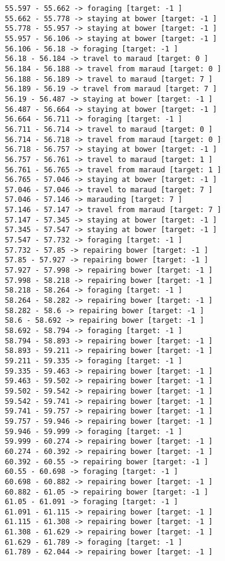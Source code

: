 \documentclass[11pt]{article}
\begin{document}
\begin{Verbatim}[commandchars=\\\{\}]
55.597 - 55.662 -> foraging [target: -1 ]
55.662 - 55.778 -> staying at bower [target: -1 ]
55.778 - 55.957 -> staying at bower [target: -1 ]
55.957 - 56.106 -> staying at bower [target: -1 ]
56.106 - 56.18 -> foraging [target: -1 ]
56.18 - 56.184 -> travel to maraud [target: 0 ]
56.184 - 56.188 -> travel from maraud [target: 0 ]
56.188 - 56.189 -> travel to maraud [target: 7 ]
56.189 - 56.19 -> travel from maraud [target: 7 ]
56.19 - 56.487 -> staying at bower [target: -1 ]
56.487 - 56.664 -> staying at bower [target: -1 ]
56.664 - 56.711 -> foraging [target: -1 ]
56.711 - 56.714 -> travel to maraud [target: 0 ]
56.714 - 56.718 -> travel from maraud [target: 0 ]
56.718 - 56.757 -> staying at bower [target: -1 ]
56.757 - 56.761 -> travel to maraud [target: 1 ]
56.761 - 56.765 -> travel from maraud [target: 1 ]
56.765 - 57.046 -> staying at bower [target: -1 ]
57.046 - 57.046 -> travel to maraud [target: 7 ]
57.046 - 57.146 -> marauding [target: 7 ]
57.146 - 57.147 -> travel from maraud [target: 7 ]
57.147 - 57.345 -> staying at bower [target: -1 ]
57.345 - 57.547 -> staying at bower [target: -1 ]
57.547 - 57.732 -> foraging [target: -1 ]
57.732 - 57.85 -> repairing bower [target: -1 ]
57.85 - 57.927 -> repairing bower [target: -1 ]
57.927 - 57.998 -> repairing bower [target: -1 ]
57.998 - 58.218 -> repairing bower [target: -1 ]
58.218 - 58.264 -> foraging [target: -1 ]
58.264 - 58.282 -> repairing bower [target: -1 ]
58.282 - 58.6 -> repairing bower [target: -1 ]
58.6 - 58.692 -> repairing bower [target: -1 ]
58.692 - 58.794 -> foraging [target: -1 ]
58.794 - 58.893 -> repairing bower [target: -1 ]
58.893 - 59.211 -> repairing bower [target: -1 ]
59.211 - 59.335 -> foraging [target: -1 ]
59.335 - 59.463 -> repairing bower [target: -1 ]
59.463 - 59.502 -> repairing bower [target: -1 ]
59.502 - 59.542 -> repairing bower [target: -1 ]
59.542 - 59.741 -> repairing bower [target: -1 ]
59.741 - 59.757 -> repairing bower [target: -1 ]
59.757 - 59.946 -> repairing bower [target: -1 ]
59.946 - 59.999 -> foraging [target: -1 ]
59.999 - 60.274 -> repairing bower [target: -1 ]
60.274 - 60.392 -> repairing bower [target: -1 ]
60.392 - 60.55 -> repairing bower [target: -1 ]
60.55 - 60.698 -> foraging [target: -1 ]
60.698 - 60.882 -> repairing bower [target: -1 ]
60.882 - 61.05 -> repairing bower [target: -1 ]
61.05 - 61.091 -> foraging [target: -1 ]
61.091 - 61.115 -> repairing bower [target: -1 ]
61.115 - 61.308 -> repairing bower [target: -1 ]
61.308 - 61.629 -> repairing bower [target: -1 ]
61.629 - 61.789 -> foraging [target: -1 ]
61.789 - 62.044 -> repairing bower [target: -1 ]

\end{Verbatim}
\end{document}
